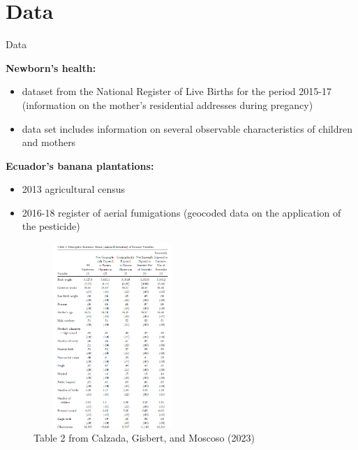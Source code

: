 \documentclass[hyperref={pdfpagelabels=false}]{beamer}
\begin{document}
        \section{Data}

        \begin{frame}{Data}
        
\textbf{Newborn's health:}
        \begin{itemize}
        \justifying
        
            \item dataset from the National Register of Live Births for the period 2015-17  (information on the mother's residential addresses during pregancy)
            \item data set includes information on several observable characteristics of children and mothers
            \end{itemize}
    \textbf{Ecuador's banana plantations:}
            \begin{itemize}
                \item 2013 agricultural census
                \item 2016-18 register of aerial fumigations (geocoded data on the application of the pesticide)
            \end{itemize}
            
        \end{frame}

\begin{frame}{}

\begin{figure}[H]
    \centering
    \includegraphics[width=6cm, height=7cm]{figures-paper/table2.png}
    \caption{Table 2 from Calzada, Gisbert, and Moscoso (2023)}
    \label{fig:enter-label}
\end{figure}
    
\end{frame}
\end{document}
